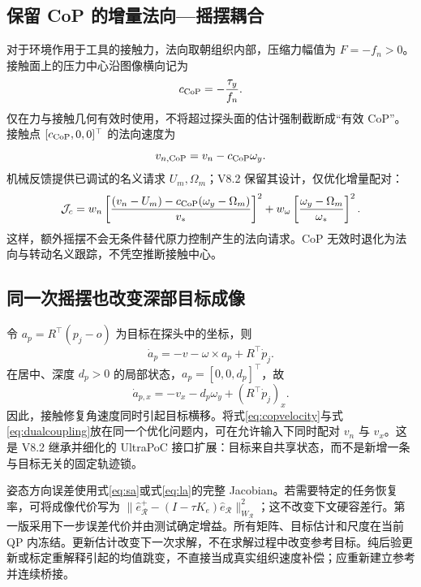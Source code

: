\documentclass[UTF8,11pt,a4paper,fontset=fandol]{ctexart}
\numberwithin{equation}{section}
\theoremstyle{definition}
\begin{document}
\subsection{保留 CoP 的增量法向—摇摆耦合}
对于环境作用于工具的接触力，法向取朝组织内部，压缩力幅值为 $F=-f_n>0$。接触面上的压力中心沿图像横向记为
\begin{equation}
c_{\rm CoP}=-\frac{\tau_y}{f_n}.
\label{eq:cop}
\end{equation}
仅在力与接触几何有效时使用，不将超过探头面的估计强制截断成“有效 CoP”。接触点 $[c_{\rm CoP},0,0]^\top$ 的法向速度为
\begin{equation}
v_{n,\rm CoP}=v_n-c_{\rm CoP}\omega_y.
\label{eq:copvelocity}
\end{equation}
机械反馈提供已调试的名义请求 $U_m,\Omega_m$；V8.2 保留其设计，仅优化增量配对：
\begin{equation}
\mathcal J_c=
 w_n\left[
\frac{(v_n-U_m)-c_{\rm CoP}(\omega_y-\Omega_m)}{v_*}
\right]^2
+w_\omega\left[\frac{\omega_y-\Omega_m}{\omega_*}\right]^2.
\label{eq:contactcost}
\end{equation}
这样，额外摇摆不会无条件替代原力控制产生的法向请求。CoP 无效时退化为法向与转动名义跟踪，不凭空推断接触中心。

\subsection{同一次摇摆也改变深部目标成像}
令 $a_p=R^\top(p_j-o)$ 为目标在探头中的坐标，则
\begin{equation}
\dot a_p=-v-\omega\times a_p+R^\top\dot p_j.
\label{eq:imagingdynamics}
\end{equation}
在居中、深度 $d_p>0$ 的局部状态，$a_p=[0,0,d_p]^\top$，故
\begin{equation}
\dot a_{p,x}=-v_x-d_p\omega_y+(R^\top\dot p_j)_x.
\label{eq:dualcoupling}
\end{equation}
因此，接触修复角速度同时引起目标横移。将式\eqref{eq:copvelocity}与式\eqref{eq:dualcoupling}放在同一个优化问题内，可在允许输入下同时配对 $v_n$ 与 $v_x$。这是 V8.2 继承并细化的 UltraPoC 接口扩展：目标来自共享状态，而不是新增一条与目标无关的固定轨迹锁。

姿态方向误差使用式\eqref{eq:sa}或式\eqref{eq:la}的完整 Jacobian。若需要特定的任务恢复率，可将成像代价写为 $\|\widehat e_{\mathcal R}^{+}-(I-\tau K_e)\widehat e_{\mathcal R}\|_{W_{\mathcal R}}^2$；这不改变下文硬容差行。第一版采用下一步误差代价并由测试确定增益。所有矩阵、目标估计和尺度在当前 QP 内冻结。更新估计改变下一次求解，不在求解过程中改变参考目标。纯后验更新或标定重解释引起的均值跳变，不直接当成真实组织速度补偿；应重新建立参考并连续桥接。
\end{document}
